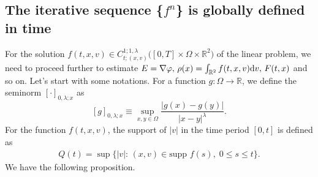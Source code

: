 \documentclass[11pt,reqno]{amsart}%
\theoremstyle{definition}
\theoremstyle{remark}
\begin{document}
\subsection{The iterative sequence \{$f^{n}$\} is globally defined in time}
For the solution  $f(t,x,v)\in C^{1;1,\lambda}_{t;(x,v)}\big([0,T]\times\Omega\times\mathbb{R}^{2}\big)$ of  the linear problem, we need to proceed further to estimate
$E=\nabla \varphi,\, \rho(x)=\int_{\mathbb{R}^{2}}f(t,x,v){\rm d}v, \,F(t,x)$ and so on. Let's start with some notations.
For a function $g:\Omega\rightarrow \mathbb{R}$, we define the seminorm $[\cdot]_{0,\lambda;x}$ as
$$[g]_{0,\lambda;x}\equiv\sup_{x,y\in\Omega}\frac{|g(x)-g(y)|}{|x-y|^{\lambda}}.$$
For the function $f(t,x,v)$, the support of $|v|$ in the time period $[0,t]$ is defined as
\begin{align}
 Q(t)=\sup\{|v|: \,(x,v)\in \text{supp } f(s), \; 0\leq s\leq t\}.\label{v5.7}
\end{align}
We have the following proposition.
\end{document}
